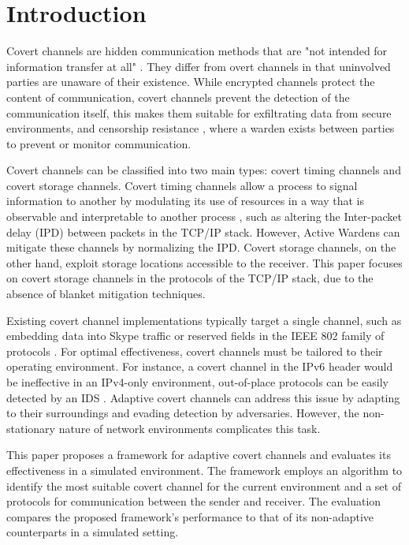 \chapter{Introduction}
\label{chap:introduction}

Covert channels are hidden communication methods that are "not intended for information transfer at all" \cite{ANOTCP}. They differ from overt channels in that uninvolved parties are unaware of their existence. While encrypted channels protect the content of communication, covert channels prevent the detection of the communication itself, this makes them suitable for exfiltrating data from secure environments, and censorship resistance \cite{TWACCS}, where a warden exists between parties to prevent or monitor communication.

Covert channels can be classified into two main types: covert timing channels and covert storage channels. Covert timing channels allow a process to signal information to another by modulating its use of resources in a way that is observable and interpretable to another process \cite{TCSEC}, such as altering the Inter-packet delay (IPD) between packets in the TCP/IP stack. However, Active Wardens \cite{DIAWAPSCC} can mitigate these channels by normalizing the IPD. Covert storage channels, on the other hand, exploit storage locations accessible to the receiver. This paper focuses on covert storage channels in the protocols of the TCP/IP stack, due to the absence of blanket mitigation techniques.

Existing covert channel implementations typically target a single channel, such as embedding data into Skype traffic \cite{DAMBCTCST} or reserved fields in the IEEE 802 family of protocols \cite{CCiLANP}. For optimal effectiveness, covert channels must be tailored to their operating environment. For instance, a covert channel in the IPv6 header would be ineffective in an IPv4-only environment, out-of-place protocols can be easily detected by an IDS \cite{TWACCS}. Adaptive covert channels can address this issue by adapting to their surroundings and evading detection by adversaries. However, the non-stationary nature of network environments \cite{PNFD} complicates this task.

This paper proposes a framework for adaptive covert channels and evaluates its effectiveness in a simulated environment. The framework employs an algorithm to identify the most suitable covert channel for the current environment and a set of protocols for communication between the sender and receiver. The evaluation compares the proposed framework's performance to that of its non-adaptive counterparts in a simulated setting.
